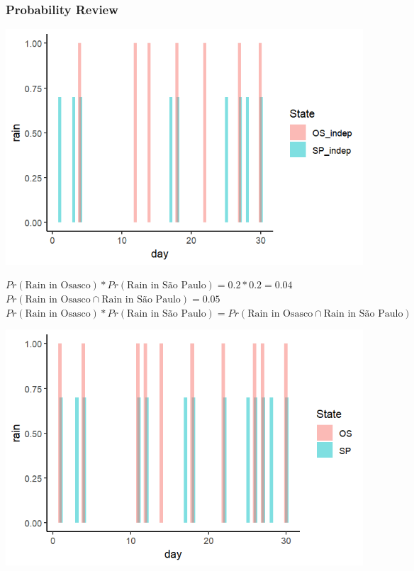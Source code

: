 \documentclass[xcolor=x11names,compress]{beamer}\usepackage[]{graphicx}\usepackage[]{color}
\makeatletter
\def\maxwidth{ %
  \ifdim\Gin@nat@width>\linewidth
    \linewidth
  \else
    \Gin@nat@width
  \fi
}
\newenvironment{knitrout}{}{} %
\renewcommand{\(}{\begin{columns}}
\renewcommand{\)}{\end{columns}}
\newcommand{\<}[1]{\begin{column}{#1}}
\renewcommand{\>}{\end{column}}
\makeatother
\begin{document}
\begin{frame}
\frametitle{Probability Review}

\begin{multicols}{2}
\begin{knitrout}
\color{fgcolor}
\includegraphics[width=\maxwidth]{figure/rain_graph1-1} 

\end{knitrout}
\footnotesize
$Pr(\text{Rain in Osasco})*Pr(\text{Rain in S\~{a}o Paulo}) = 0.2 * 0.2 = 0.04$ \\
$Pr(\text{Rain in Osasco} \cap  \text{Rain in S\~{a}o Paulo}) = 0.05$ \\
$Pr(\text{Rain in Osasco})*Pr(\text{Rain in S\~{a}o Paulo}) = Pr(\text{Rain in Osasco} \cap  \text{Rain in S\~{a}o Paulo})$ \\
\normalsize

\columnbreak

\begin{knitrout}
\color{fgcolor}
\includegraphics[width=\maxwidth]{figure/rain_graph2-1} 


\end{knitrout}
\end{multicols}
\end{frame}
\end{document}

